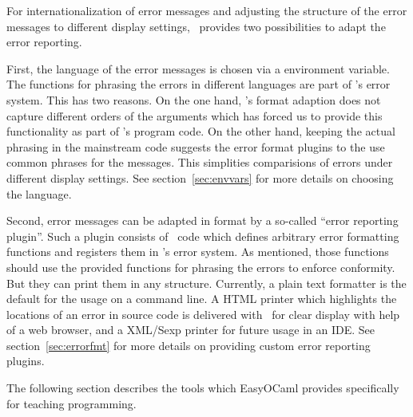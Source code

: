 For internationalization of error messages and adjusting the structure of the
error messages to different display settings, \easyocaml\ provides two
possibilities to adapt the error reporting.

First, the language of the error messages is chosen via a environment variable.
The functions for phrasing the errors in different languages are part of
\easyocaml's error system. This has two reasons. On the one hand, \ocaml's
format adaption does not capture different orders of the arguments which has
forced us to provide this functionality as part of \easyocaml's program code. On
the other hand, keeping the actual phrasing in the mainstream code suggests the
error format plugins to the use common phrases for the messages.
This simplities comparisions of errors under different display settings.
See section~\ref{sec:envvars} for more details on choosing the language.

Second, error messages can be adapted in format by a so-called ``error reporting
plugin''. Such a plugin consists of \ocaml\ code which defines arbitrary error
formatting functions and registers them in \easyocaml's error system.
As mentioned, those functions should use the provided functions for phrasing the
errors to enforce conformity. But they can print them in any structure.
Currently, a plain text formatter is the default for the usage on a command
line.
A HTML printer which highlights the locations of an error in source code is
delivered with \easyocaml\ for clear display with help of a web browser, and a
XML/Sexp printer for future usage in an IDE.
See section~\ref{sec:errorfmt} for more details on providing custom error
reporting plugins.

The following section describes the tools which EasyOCaml provides 
specifically for teaching programming.
